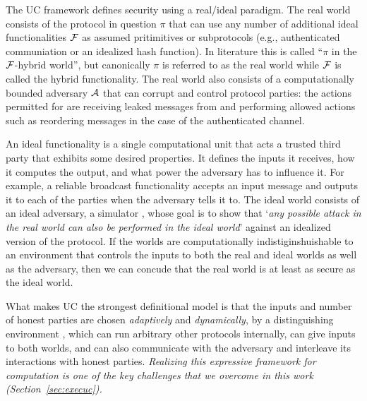 
The UC framework defines security using a real/ideal paradigm.
The real world consists of the protocol in question $\pi$ that can use any number of additional ideal
functionalities $\mathcal{F}$ as assumed pritimitives or subprotocols (e.g., authenticated communiation or an idealized hash function).
In literature this is called ``$\pi$ in the $\mathcal{F}$-hybrid world'', but canonically $\pi$ is referred to as the real world
while $\mathcal{F}$ is called the hybrid functionality.
The real world also consists of a computationally bounded adversary $\mathcal{A}$ that can corrupt and control protocol parties:
the actions permitted for \A are receiving leaked messages from \F and performing allowed actions such as reordering
messages in the case of the authenticated channel.

An ideal functionality is a single computational unit that acts a trusted third party that exhibits some desired properties. 
It defines the inputs it receives, how it computes the output, and what power the adversary has to influence it.
For example, a reliable broadcast functionality accepts an input message and outputs it to each of the parties
when the adversary tells it to.
The ideal world consists of an ideal adversary, a simulator \Sim, whose goal is to show that `\emph{any possible attack
in the real world can also be performed in the ideal world}' against an idealized version of the protocol.
If the worlds are computationally indistiginshuishable to an environment \Z that controls the inputs to both the
real and ideal worlds as well as the adversary, then we can concude that the real world is at least as secure as the ideal world.

What makes UC the strongest definitional model is that the inputs and number of honest parties are chosen \emph{adaptively}
and \emph{dynamically}, by a distinguishing environment \Z, which can run arbitrary other protocols internally,
can give inputs to both worlds, and can also communicate with the adversary and interleave its interactions with honest parties.
\emph{Realizing this expressive framework for computation is one of the key challenges that we overcome
in this work (Section~\ref{sec:execuc}).}


